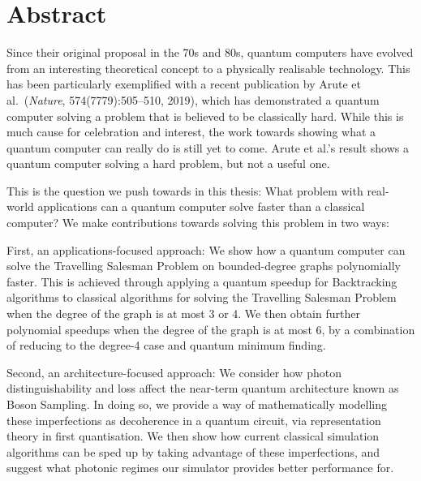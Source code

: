 \chapter*{Abstract}

Since their original proposal in the 70s and 80s, quantum computers have evolved from an interesting theoretical concept to a physically realisable technology. This has been particularly exemplified with a recent publication by Arute et al.~(\emph{Nature}, 574(7779):505--510, 2019), which has demonstrated a quantum computer solving a problem that is believed to be classically hard. While this is much cause for celebration and interest, the work towards showing what a quantum computer can really do is still yet to come. Arute et al.'s result shows a quantum computer solving a hard problem, but not a useful one.

This is the question we push towards in this thesis: What problem with real-world applications can a quantum computer solve faster than a classical computer? We make contributions towards solving this problem in two ways:

First, an applications-focused approach: We show how a quantum computer can solve the Travelling Salesman Problem on bounded-degree graphs polynomially faster. This is achieved through applying a quantum speedup for Backtracking algorithms to classical algorithms for solving the Travelling Salesman Problem when the degree of the graph is at most 3 or 4. We then obtain further polynomial speedups when the degree of the graph is at most 6, by a combination of reducing to the degree-4 case and quantum minimum finding.

Second, an architecture-focused approach: We consider how photon distinguishability and loss affect the near-term quantum architecture known as Boson Sampling. In doing so, we provide a way of mathematically modelling these imperfections as decoherence in a quantum circuit, via representation theory in first quantisation. We then show how current classical simulation algorithms can be sped up by taking advantage of these imperfections, and suggest what photonic regimes our simulator provides better performance for.
